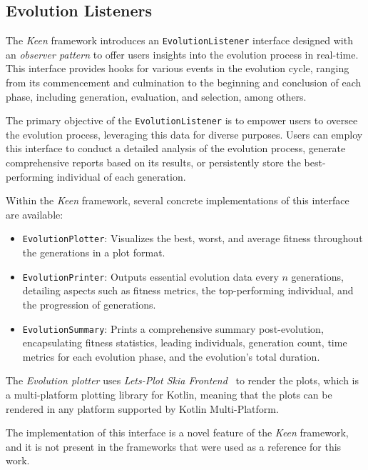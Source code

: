 \subsection{Evolution Listeners}
\label{sec:keen:ga:listeners}

  The \textit{Keen} framework introduces an \texttt{EvolutionListener} 
  interface designed with an \textit{observer pattern} to offer users insights 
  into the evolution process in real-time.
  This interface provides hooks for various events in the evolution cycle, 
  ranging from its commencement and culmination to the beginning and conclusion 
  of each phase, including generation, evaluation, and selection, among others.

  The primary objective of the \texttt{EvolutionListener} is to empower users 
  to oversee the evolution process, leveraging this data for diverse purposes. 
  Users can employ this interface to conduct a detailed analysis of the 
  evolution process, generate comprehensive reports based on its results, or 
  persistently store the best-performing individual of each generation.

  Within the \textit{Keen} framework, several concrete implementations of this 
  interface are available:

  \begin{itemize}
    \item \texttt{EvolutionPlotter}: Visualizes the best, worst, and average 
      fitness throughout the generations in a plot format.
    \item \texttt{EvolutionPrinter}: Outputs essential evolution data every 
      \(n\) generations, detailing aspects such as fitness metrics, the 
      top-performing individual, and the progression of generations.
    \item \texttt{EvolutionSummary}: Prints a comprehensive summary 
      post-evolution, encapsulating fitness statistics, leading individuals, 
      generation count, time metrics for each evolution phase, and the 
      evolution's total duration.
  \end{itemize}

  \begin{remark}
    The \emph{Evolution plotter} uses \textit{Lets-Plot Skia Frontend}~\autocite{JetBrainsLetsplotskiaSkia} to render
    the plots, which is a multi-platform plotting library for Kotlin, meaning that the plots can be rendered in any 
    platform supported by Kotlin Multi-Platform.
  \end{remark}

  The implementation of this interface is a novel feature of the \textit{Keen}
  framework, and it is not present in the frameworks that were used as a
  reference for this work.
